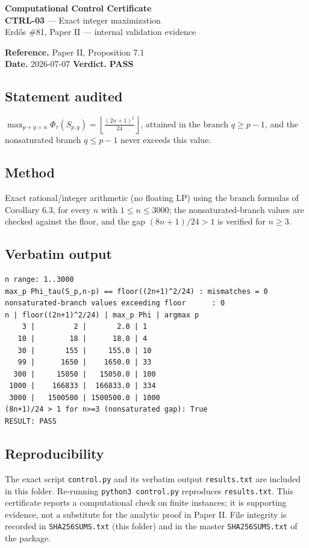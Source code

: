 \documentclass[11pt]{article}
\begin{document}
\begin{center}{\Large\textbf{Computational Control Certificate}}\\[2pt]
{\large \textbf{CTRL-03} --- Exact integer maximization}\\[2pt]
Erd\H{o}s \#81, Paper II --- internal validation evidence\\
\end{center}
\vspace{0.3em}
\noindent\textbf{Reference.} Paper II, Proposition 7.1\\
\textbf{Date.} 2026-07-07 \qquad \textbf{Verdict.} \textcolor{pass}{\textbf{PASS}}

\subsection*{Statement audited}
$\displaystyle\max_{p+q=n}\Phi_\tau(S_{p,q})=\left\lfloor\frac{(2n+1)^2}{24}\right\rfloor$, attained in the branch $q\ge p-1$, and the nonsaturated branch $q\le p-1$ never exceeds this value.

\subsection*{Method}
Exact rational/integer arithmetic (no floating LP) using the branch formulas of Corollary 6.3, for every $n$ with $1\le n\le 3000$; the nonsaturated-branch values are checked against the floor, and the gap $(8n+1)/24>1$ is verified for $n\ge3$.

\subsection*{Verbatim output}
\begin{Verbatim}[fontsize=\small,frame=single]
n range: 1..3000
max_p Phi_tau(S_p,n-p) == floor((2n+1)^2/24) : mismatches = 0
nonsaturated-branch values exceeding floor      : 0
n | floor((2n+1)^2/24) | max_p Phi | argmax p
    3 |         2 |       2.0 | 1
   10 |        18 |      18.0 | 4
   30 |       155 |     155.0 | 10
   99 |      1650 |    1650.0 | 33
  300 |     15050 |   15050.0 | 100
 1000 |    166833 |  166833.0 | 334
 3000 |   1500500 | 1500500.0 | 1000
(8n+1)/24 > 1 for n>=3 (nonsaturated gap): True
RESULT: PASS

\end{Verbatim}

\subsection*{Reproducibility}
The exact script \texttt{control.py} and its verbatim output \texttt{results.txt} are included in this
folder. Re-running \texttt{python3 control.py} reproduces \texttt{results.txt}. This certificate reports a
computational check on finite instances; it is supporting evidence, not a substitute for the analytic
proof in Paper II. File integrity is recorded in \texttt{SHA256SUMS.txt} (this folder) and in the master
\texttt{SHA256SUMS.txt} of the package.
\end{document}
